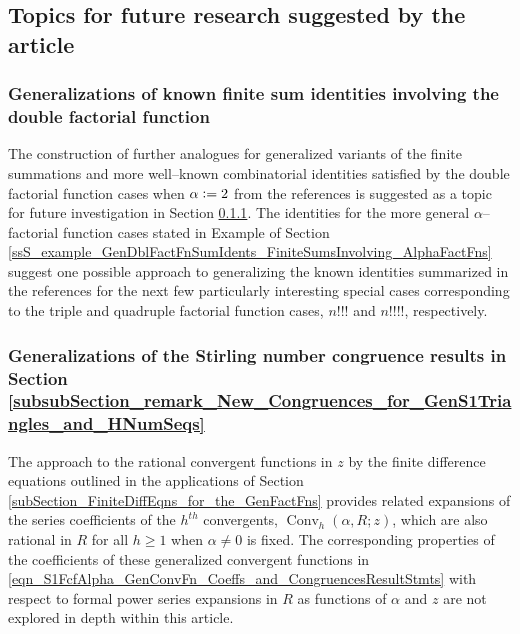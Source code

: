 \documentclass[12pt,reqno]{article}
\numberwithin{sfootnote}{section}
\numberwithin{equation}{section}
\theoremstyle{DefaultTheoremStyle}
\theoremstyle{definition}
\newcommand{\defequals}{\ensuremath{\vcentcolon=}}
\newcommand{\ConvGF}[4]{\ensuremath{\Conv_{#1}\left(#2, #3; #4\right)}}
\DeclareMathOperator{\Conv}{Conv}
\begin{document}
\subsection{Topics for future research suggested by the article} 

\subsubsection{Generalizations of known finite sum identities involving the 
               double factorial function} 
\label{subsubSection_FutureResTopics_GenDblFactFnSumIdents_FiniteSums} 

The construction of further 
analogues for generalized variants of the finite summations and 
more well--known combinatorial identities satisfied by the 
double factorial function cases when $\alpha \defequals 2$ from the 
references is suggested as a topic for future investigation in 
Section \ref{subsubSection_FutureResTopics_GenDblFactFnSumIdents_FiniteSums}. 
The identities for the more general $\alpha$--factorial function cases 
stated in 
Example \label{example_GenDblFactFnSumIdents_FiniteSumsInvolving_AlphaFactFns} of 
Section \ref{ssS_example_GenDblFactFnSumIdents_FiniteSumsInvolving_AlphaFactFns} 
suggest one possible approach to generalizing the 
known identities summarized in the references 
\citep{MAA-FUN-WITH-DBLFACT,DBLFACTFN-COMBIDENTS-SURVEY} for the 
next few particularly interesting special cases corresponding to the 
triple and quadruple factorial function cases, $n!!!$ and $n!!!!$, 
respectively. 

\subsubsection{Generalizations of the Stirling number 
               congruence results in 
               Section \ref{subsubSection_remark_New_Congruences_for_GenS1Triangles_and_HNumSeqs}} 
\label{subsubSection_FutureResTopics_GenSNumCongResults} 

     The approach to the rational convergent functions in $z$ by the 
     finite difference equations outlined in the applications of 
     Section \ref{subSection_FiniteDiffEqns_for_the_GenFactFns} 
     provides related expansions of the series coefficients of the 
     $h^{th}$ convergents, $\ConvGF{h}{\alpha}{R}{z}$, which are also 
     rational in $R$ for all $h \geq 1$ when $\alpha \neq 0$ is fixed. 
     The corresponding properties of the coefficients of these 
     generalized convergent functions in 
     \eqref{eqn_S1FcfAlpha_GenConvFn_Coeffs_and_CongruencesResultStmts} 
     with respect to formal power series expansions in $R$ 
     as functions of $\alpha$ and $z$ are not explored in 
     depth within this article. 
\end{document}
